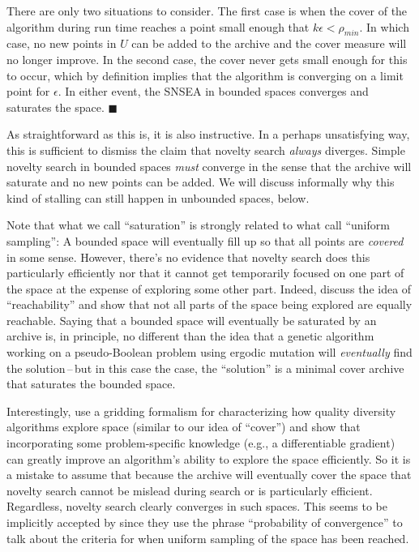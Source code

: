 \documentclass[twoside]{article}
\begin{document}
There are only two situations to consider.  The first case is when the cover of the algorithm during run time reaches a point small enough that $k\epsilon < \rho_{min}$.  In which case, no new points in $U$ can be added to the archive and the cover measure will no longer improve.  In the second case, the cover never gets small enough for this to occur, which by definition implies that the algorithm is converging on a limit point for $\epsilon$.  In either event, the SNSEA in bounded spaces converges and saturates the space. $\blacksquare$

\vspace*{1ex}

As straightforward as this is, it is also instructive.  In a perhaps unsatisfying way, this is sufficient to dismiss the claim that novelty search \emph{always} diverges.  Simple novelty search in bounded spaces \emph{must} converge in the sense that the archive will saturate and no new points can be added.  We will discuss informally why this kind of stalling can still happen in unbounded spaces, below.

Note that what we call ``saturation'' is strongly related to what \citet{Doncieux2019gecco} call ``uniform sampling'':  A bounded space will eventually fill up so that all points are \emph{covered} in some sense.  However, there's no evidence that novelty search does this particularly efficiently nor that it cannot get temporarily focused on one part of the space at the expense of exploring some other part. Indeed, \citet{Doncieux2019gecco} discuss the idea of ``reachability'' and show that not all parts of the space being explored are equally reachable.  Saying that a bounded space will eventually be saturated by an archive is, in principle, no different than the idea that a genetic algorithm working on a pseudo-Boolean problem using ergodic mutation will \emph{eventually} find the solution\,--\,but in this case the case, the ``solution'' is a minimal cover archive that saturates the bounded space.

Interestingly, \citet{Fontaine2021corr} use a gridding formalism for characterizing how quality diversity algorithms explore space (similar to our idea of ``cover'') and show that incorporating some problem-specific knowledge (e.g., a differentiable gradient) can greatly improve an algorithm's ability to explore the space efficiently.  So it is a mistake to assume that because the archive will eventually cover the space that novelty search cannot be mislead during search or is particularly efficient.  Regardless, novelty search clearly converges in such spaces.  This seems to be implicitly accepted by \citet{Doncieux2019gecco} since they use the phrase ``probability of convergence'' to talk about the criteria for when uniform sampling of the space has been reached.
\end{document}
